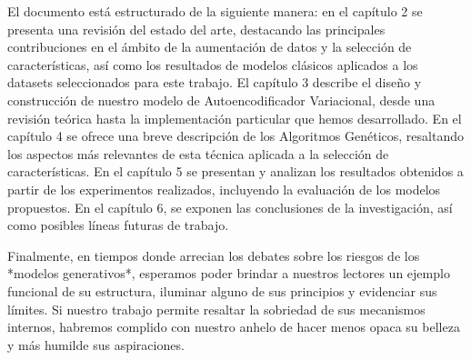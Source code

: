 El documento está estructurado de la siguiente manera: en el capítulo 2 se presenta una revisión del estado del arte, destacando las principales contribuciones en el ámbito de la aumentación de datos y la selección de características, así como los resultados de modelos clásicos aplicados a los datasets seleccionados para este trabajo. El capítulo 3 describe el diseño y construcción de nuestro modelo de Autoencodificador Variacional, desde una revisión teórica hasta la implementación particular que hemos desarrollado. En el capítulo 4 se ofrece una breve descripción de los Algoritmos Genéticos, resaltando los aspectos más relevantes de esta técnica aplicada a la selección de características. En el capítulo 5 se presentan y analizan los resultados obtenidos a partir de los experimentos realizados, incluyendo la evaluación de los modelos propuestos. En el capítulo 6, se exponen las conclusiones de la investigación, así como posibles líneas futuras de trabajo.

Finalmente, en tiempos donde arrecian los debates sobre los riesgos de los *modelos generativos*, esperamos poder brindar a nuestros lectores un ejemplo funcional de su estructura, iluminar alguno de sus principios y evidenciar sus límites. Si nuestro trabajo permite resaltar la sobriedad de sus mecanismos internos, habremos complido con nuestro anhelo de hacer menos opaca su belleza y más humilde sus aspiraciones.